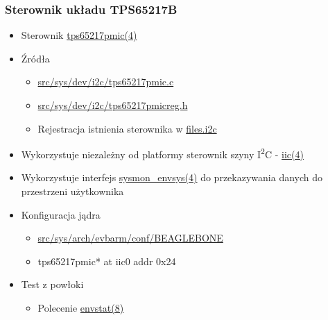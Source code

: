 \documentclass[dvipsnames,table]{beamer}
\begin{document}
\begin{frame}
\frametitle{Sterownik układu TPS65217B}
\begin{itemize}
	\item Sterownik \href{http://netbsd.gw.com/cgi-bin/man-cgi?tps65217pmic+4+NetBSD-current}{tps65217pmic(4)}
	\item Źródła
	\begin{itemize}
		\item \href{http://nxr.netbsd.org/xref/src/sys/dev/i2c/tps65217pmic.c}{src/sys/dev/i2c/tps65217pmic.c}
		\item \href{http://nxr.netbsd.org/xref/src/sys/dev/i2c/tps65217pmicreg.h}{src/sys/dev/i2c/tps65217pmicreg.h}
		\item Rejestracja istnienia sterownika w \href{http://nxr.netbsd.org/xref/src/sys/dev/i2c/files.i2c}{files.i2c}
	\end{itemize}
	\item Wykorzystuje niezależny od platformy sterownik szyny I\textsuperscript{2}C - \href{http://netbsd.gw.com/cgi-bin/man-cgi?iic+9+NetBSD-current}{iic(4)}
	\item Wykorzystuje interfejs \href{http://netbsd.gw.com/cgi-bin/man-cgi?sysmon_envsys+9+NetBSD-current}{sysmon\_envsys(4)} do przekazywania danych do przestrzeni użytkownika
	\item Konfiguracja jądra
	\begin{itemize}
		\item \href{http://nxr.netbsd.org/xref/src/sys/arch/evbarm/conf/BEAGLEBONE}{src/sys/arch/evbarm/conf/BEAGLEBONE}
		\item tps65217pmic*	at iic0 addr 0x24
	\end{itemize}
	\item Test z powłoki
	\begin{itemize}
		\item Polecenie \href{http://netbsd.gw.com/cgi-bin/man-cgi?envstat+8+NetBSD-current}{envstat(8)}
	\end{itemize}
\end{itemize}
\end{frame}

\end{document}
